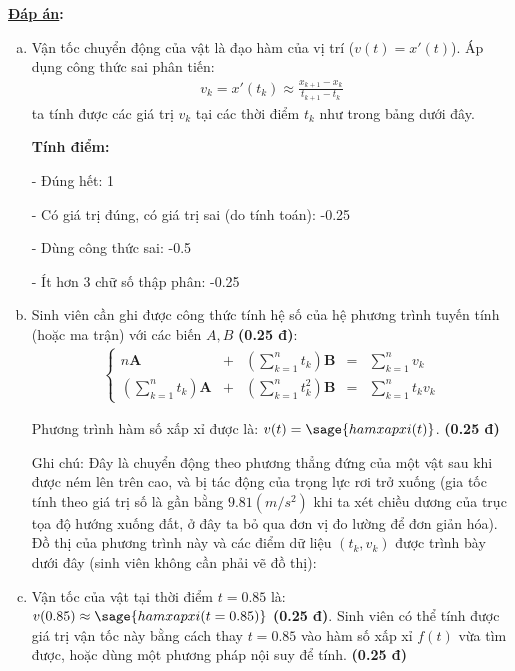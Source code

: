 \documentclass[12pt]{article}
\newcommand{\Solution}{
\medskip
{\bf \underline{Đáp án}:}
}
\begin{document}
\Solution

\begin{enumerate}[a).]
  \item Vận tốc chuyển động của vật là đạo hàm của vị trí ($v(t)=x'(t)$). Áp dụng công thức sai phân tiến:
\begin{align*}
 v_k = x'(t_k) \approx \frac{x_{k+1}-x_k}{t_{k+1}-t_k}
\end{align*}
ta tính được các giá trị $v_k$ tại các thời điểm $t_k$ như trong bảng dưới đây.

  \begin{center}  \end{center} 

  \textbf{Tính điểm:} 

- Đúng hết: 1

- Có giá trị đúng, có giá trị sai (do tính toán): -0.25

- Dùng công thức sai: -0.5

- Ít hơn 3 chữ số thập phân: -0.25

     \item Sinh viên cần ghi được công thức tính hệ số của hệ phương trình tuyến tính (hoặc ma trận) với các biến $A, B$ \textbf{(0.25 đ)}: %
     \begin{align*}
      \left\lbrace
	\begin{array}{rcccl}
	n \mathbf{A} &+& \left(\sum_{k=1}^n t_k \right) \mathbf{B} &=& \sum_{k=1}^n v_k \\
	\left(\sum_{k=1}^n t_k\right) \mathbf{A} &+& \left(\sum_{k=1}^n t_k^2 \right) \mathbf{B} &=& \sum_{k=1}^n t_k v_k
	\end{array}
      \right.
     \end{align*}

     Phương trình hàm số xấp xỉ được là: $v(t)=\sage{hamxapxi(t)}$. \textbf{(0.25 đ)} %
     
     Ghi chú: Đây là chuyển động theo phương thẳng đứng của một vật sau khi được ném lên trên cao, và bị tác động của trọng lực rơi trở xuống (gia tốc tính theo giá trị số là gần bằng $9.81 (m/s^2)$ khi ta xét chiều dương của trục tọa độ hướng xuống đất, ở đây ta bỏ qua đơn vị đo lường để đơn giản hóa). Đồ thị của phương trình này và các điểm dữ liệu $(t_k, v_k)$ được trình bày dưới đây (sinh viên không cần phải vẽ đồ thị):
     
     \begin{center}  \end{center} 
     
     \item Vận tốc của vật tại thời điểm $t=0.85$ là: $v(0.85) \approx \sage{hamxapxi(t=0.85)}$ \textbf{(0.25 đ)}. Sinh viên có thể tính được giá trị vận tốc này bằng cách thay $t=0.85$ vào hàm số xấp xỉ $f(t)$ vừa tìm được, hoặc dùng một phương pháp nội suy để tính. \textbf{(0.25 đ)}
\end{enumerate}
\end{document}
